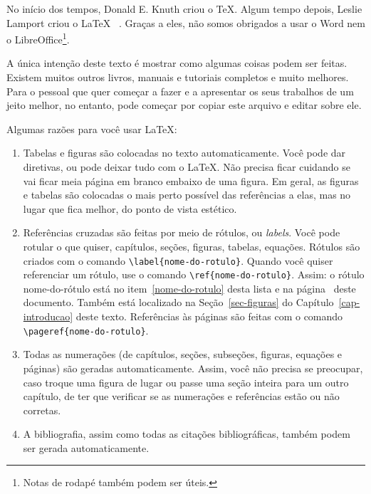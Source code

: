 No início dos tempos, Donald E. Knuth criou o \TeX. Algum tempo depois, Leslie Lamport criou o \LaTeX\ \cite{lamport94latex} . Graças a eles, não somos obrigados a usar o Word nem o LibreOffice\footnote{Notas de rodapé também podem ser úteis.}.

A única intenção deste texto é mostrar como algumas coisas podem ser feitas. Existem muitos outros livros, manuais e tutoriais completos e muito melhores. Para o pessoal que quer começar a fazer e a apresentar os seus trabalhos de um jeito melhor, no entanto, pode começar por copiar este arquivo e editar sobre ele.

Algumas razões para você usar \LaTeX:

\begin{enumerate}
    \item Tabelas e figuras são colocadas no texto automaticamente. Você pode dar diretivas, ou pode deixar tudo com o \LaTeX. Não precisa ficar cuidando se vai ficar
    meia página em branco embaixo de uma figura. Em geral, as figuras e tabelas são colocadas o mais perto possível das referências a elas, mas no lugar que fica melhor,
    do ponto de vista estético.

    \item Referências cruzadas são feitas por meio de rótulos, ou \emph{labels}. Você pode rotular o que quiser, capítulos, seções, figuras, tabelas, equações. Rótulos
    são criados com o comando \verb"\label{nome-do-rotulo}". \label{nome-do-rotulo} Quando você quiser referenciar um rótulo, use o comando \verb"\ref{nome-do-rotulo}".
    Assim: o rótulo nome-do-rótulo está no item~\ref{nome-do-rotulo} desta lista e na página~\pageref{nome-do-rotulo} deste documento. Também está localizado na
    Seção~\ref{sec-figuras} do Capítulo~\ref{cap-introducao} deste texto. Referências às páginas são feitas com o comando \verb"\pageref{nome-do-rotulo}".

    \item Todas as numerações (de capítulos, seções, subseções, figuras, equações e páginas) são geradas automaticamente. Assim, você não precisa se preocupar, caso
    troque uma figura de lugar ou passe uma seção inteira para um outro capítulo, de ter que verificar se as numerações e referências estão ou não corretas.

    \item A bibliografia, assim como todas as citações bibliográficas, também podem ser gerada automaticamente.
\end{enumerate}


